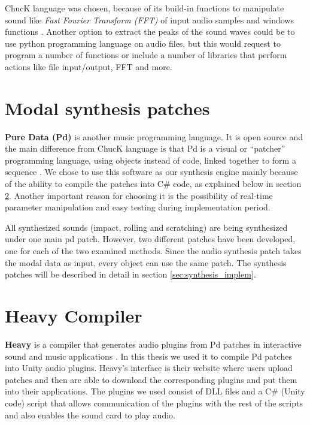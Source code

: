 ChucK language was chosen, because of its build-in functions to manipulate sound like \textit{Fast Fourier Transform (FFT)} of input audio samples and windows functions \cite{bib:chuck_doc}. Another option to extract the peaks of the sound waves could be to use python programming language on audio files, but this would request to program a number of functions or include a number of libraries that perform actions like file input/output, FFT and more. 

 
\section{Modal synthesis patches}
\textbf{Pure Data (Pd)} is another music programming language. It is open source and the main difference from ChucK language is that Pd is a visual or ``patcher'' programming language, using objects instead of code, linked together to form a sequence \cite{bib:pd}. We chose to use this software as our synthesis engine mainly because of the ability to compile the patches into C\# code, as explained below in section \ref{sec:heavy}. Another important reason for choosing it is the possibility of real-time parameter manipulation and easy testing during implementation period.

All synthesized sounds (impact, rolling and scratching) are being synthesized under one main pd patch. However, two different patches have been developed, one for each of the two examined methods. Since the audio synthesis patch takes the modal data as input, every object can use the same patch. The synthesis patches will be described in detail in section \ref{sec:synthesis_implem}.



\section{Heavy Compiler}\label{sec:heavy}
\textbf{Heavy} is a compiler that generates audio plugins from Pd patches in interactive sound and music applications \cite{bib:heavy}. In this thesis we used it to compile Pd patches into Unity\textsuperscript{\textregistered} audio plugins. Heavy's interface is their website where users upload patches and then are able to download the corresponding plugins and put them into their applications. The plugins we used consist of DLL files and a C\# (Unity\textsuperscript{\textregistered} code) script that allows communication of the plugins with the rest of the scripts and also enables the sound card to play audio.

